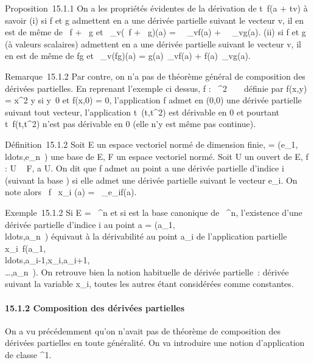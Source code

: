 \documentclass[]{article}
\begin{document}
Proposition~15.1.1 On a les propriétés évidentes de la dérivation de
t\mapsto~f(a + tv) à savoir (i) si f et g admettent
en a une dérivée partielle suivant le vecteur v, il en est de même de \alpha~f
+ \beta~g et \partial~\_v(\alpha~f + \beta~g)(a) = \alpha~\partial~\_vf(a) +
\beta~\partial~\_vg(a). (ii) si f et g (à valeurs scalaires) admettent en a
une dérivée partielle suivant le vecteur v, il en est de même de fg et
\partial~\_v(fg)(a) = g(a)\partial~\_vf(a) + f(a)\partial~\_vg(a).

Remarque~15.1.2 Par contre, on n'a pas de théorème général de
composition des dérivées partielles. En reprenant l'exemple ci dessus, f
: ~^2 \rightarrow~ ~ définie par f(x,y) = x^2
\over y si y\neq~0 et f(x,0) =
0, l'application f admet en (0,0) une dérivée partielle suivant tout
vecteur, l'application t\mapsto~(t,t^2)
est dérivable en 0 et pourtant
t\mapsto~f(t,t^2) n'est pas dérivable en
0 (elle n'y est même pas continue).

Définition~15.1.2 Soit E un espace vectoriel normé de dimension finie, 
=
(e\_1,\\ldots,e\_n~)
une base de E, F un espace vectoriel normé. Soit U un ouvert de E, f : U
\rightarrow~ F, a \in U. On dit que f admet au point a une dérivée partielle d'indice
i (suivant la base ) si elle admet une dérivée partielle suivant le
vecteur e\_i. On note alors  \partial~f \over
\partial~x\_i (a) = \partial~\_e\_if(a).

Exemple~15.1.2 Si E = ~^n et si  est la base canonique de
~^n, l'existence d'une dérivée partielle d'indice i au point
a =
(a\_1,\\ldots,a\_n~)
équivaut à la dérivabilité au point a\_i de l'application
partielle
x\_i\mapsto~f(a\_1,\\ldots,a\_i-1,x\_i,a\_i+1,\\\ldots,a\_n~).
On retrouve bien la notion habituelle de dérivée partielle~: dérivée
suivant la variable x\_i, toutes les autres étant considérées
comme constantes.

\paragraph{15.1.2 Composition des dérivées partielles}

On a vu précédemment qu'on n'avait pas de théorème de composition des
dérivées partielles en toute généralité. On va introduire une notion
d'application de classe ^1.
\end{document}
